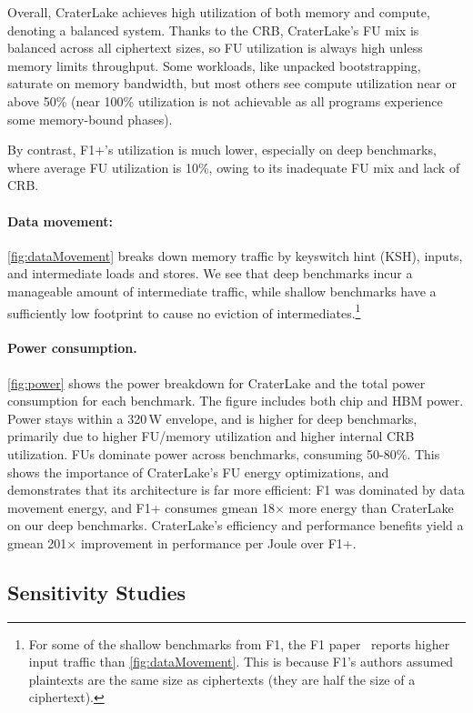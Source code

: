 Overall, CraterLake achieves high utilization of both memory and compute,
denoting a balanced system. Thanks to the CRB, CraterLake's FU mix is balanced
across all ciphertext sizes, so FU utilization is always high unless memory
limits throughput. Some workloads, like unpacked bootstrapping, saturate on
memory bandwidth, but most others see compute utilization near or above 50\%
(near 100\% utilization is not achievable as all programs experience some
memory-bound phases).

By contrast, F1+'s utilization is much lower, especially on deep benchmarks,
where average FU utilization is 10\%, owing to its inadequate FU mix and lack
of CRB.

\figDataMovementAndPower

\paragraph{Data movement:} \autoref{fig:dataMovement}
breaks down memory traffic by keyswitch hint (KSH), inputs, and intermediate
loads and stores. We see that deep benchmarks incur a manageable amount of
intermediate traffic, while shallow benchmarks have a sufficiently low
footprint to cause no eviction of intermediates.\footnote{For some of the
    shallow benchmarks from F1, the F1 paper~\cite{feldmann:micro21:f1} reports
    higher input traffic than \autoref{fig:dataMovement}. This is because F1's
    authors assumed plaintexts are the same size as ciphertexts (they are half
the size of a ciphertext).}

\paragraph{Power consumption.}
\autoref{fig:power} shows the power breakdown for CraterLake and the total
power consumption for each benchmark. The figure includes both chip and HBM
power. Power stays within a 320\,W envelope, and is higher for deep benchmarks,
primarily due to higher FU/memory utilization and higher internal CRB
utilization. FUs dominate power across benchmarks, consuming 50-80\%. This
shows the importance of CraterLake's FU energy optimizations, and demonstrates
that its architecture is far more efficient: F1 was dominated by data movement
energy, and F1+ consumes gmean 18$\times$ more energy than CraterLake on our
deep benchmarks. CraterLake's efficiency and performance benefits yield a gmean
201$\times$ improvement in performance per Joule over F1+.

\subsection{Sensitivity Studies}
\label{sec:sensitivity}

